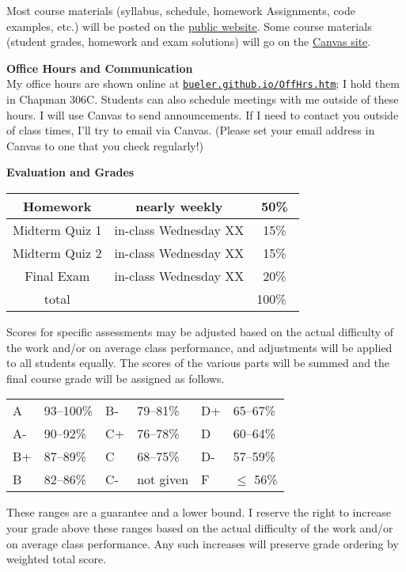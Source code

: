 \documentclass[12pt]{article}
\renewcommand{\emph}[1]{\textsf{\textbf{#1}}}
\newcommand{\localhead}[1]{\par\smallskip\textbf{#1} \smallskip\nobreak\\}%
\def\heading#1{\localhead{\large\emph{#1}}}
\begin{document}
Most course materials (syllabus, schedule, homework Assignments, code examples, etc.) will be posted on the \href{https://bueler.github.io/fa/}{public website}.  Some course materials (student grades, homework and exam solutions) will go on the \href{https://canvas.alaska.edu/courses/XX}{Canvas site}.


\clearpage\newpage
\phantom{foo}
\heading{Office Hours and Communication}
My office hours are shown online at \href{http://bueler.github.io/OffHrs.htm}{\texttt{bueler.github.io/OffHrs.htm}}; I hold them in Chapman 306C.  Students can also schedule meetings with me outside of these hours.  I will use Canvas to send announcements.  If I need to contact you outside of class times, I'll try to email via Canvas.  (Please set your email address in Canvas to one that you check regularly!)


\heading{Evaluation and Grades}
\vskip -10pt

\begin{tabular}{|c|c|c|}
\hline
Homework & nearly weekly & 50\% \\
\hline
Midterm Quiz 1 & in-class Wednesday XX & 15\%  \\
\hline
Midterm Quiz 2 & in-class Wednesday XX & 15\%  \\
\hline
Final Exam     & in-class Wednesday XX & 20\% \\
\hline
total & & 100\% \, \\
\hline
\end{tabular}

Scores for specific assessments may be adjusted based on the actual difficulty of the work and/or on average class performance, and adjustments will be applied to all students equally.  The scores of the various parts will be summed and the final course grade will be assigned as follows.

\begin{tabular}{llllll}
A  & 93--100\% & B- & 79--81\%  & D+ & 65--67\%  \\
A- & 90--92\%  & C+ & 76--78\%  & D  & 60--64\%  \\
B+ & 87--89\%  & C  & 68--75\%  & D- & 57--59\%  \\
B  & 82--86\%  & C- & not given & F  & $\le$ 56\%
\end{tabular}

These ranges are a guarantee and a lower bound.  I reserve the right to increase your grade above these ranges based on the actual difficulty of the work and/or on average class performance.  Any such increases will preserve grade ordering by weighted total score.
\end{document}
